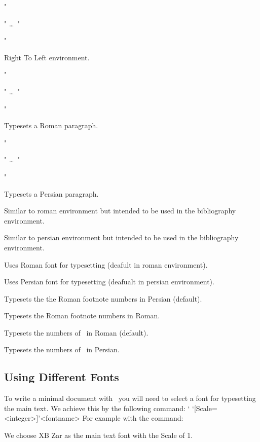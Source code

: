 \begin{Ex}
  "\begin{RTL}" \ldots\ "\end{RTL}"
\end{Ex}
Right To Left environment.

\begin{Ex}
  "\begin{roman}" \ldots\ "\end{roman}"
\end{Ex}
Typesets a Roman paragraph.

\begin{Ex}
  "\begin{persian}" \ldots\ "\end{persian}"
\end{Ex}
Typesets a Persian paragraph.
\begin{description}
\mitem \Roman

Similar to {\UsageFont roman} environment but intended to be used in the bibliography environment.

\mitem \Persian

Similar to {\UsageFont persian} environment but intended to be used in the bibliography environment.

\mitem \rmfamily 

Uses Roman font for typesetting (deafult in {\UsageFont roman} environment).

\mitem \persianfont

Uses Persian font for typesetting (deafualt in {\UsageFont persian} environment).

\mitem \PersianFootNum

Typesets the the Roman footnote numbers in Persian (default).

\mitem \RomanFootNum

Typesets the Roman footnote numbers in Roman.

\mitem \RomanBibNum

Typesets the numbers of \n\bibitem\ in Roman (default).

\mitem \PersianBibNum

Typesets the numbers of \n\bibitem\ in Persian.
\end{description}
\subsection{Using Different Fonts}
To write a minimal document with \XePersian\, you will need to select a font for typesetting the main text. We achieve this by the following command:
\begingroup
\catcode`
  \Mac  \settextfont`[Scale=<integer>]'{<fontname>}
\endgroup
For example with the command:
\begin{LVerb}
\end{LVerb}
We choose {\UsageFont XB Zar} as the main text font with the Scale of 1.

